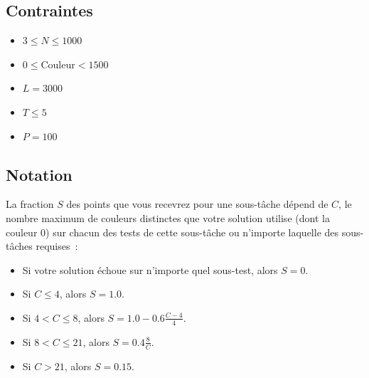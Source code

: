 \documentclass[12pt]{article}
\begin{document}
\subsection{Contraintes}

\begin{itemize}
\item $3 \leq N \leq 1000$
\item $0 \leq \mathrm{Couleur} < 1500$
\item $L = 3000$
\item $T \leq 5$
\item $P = 100$
\end{itemize}

\subsection{Notation}

La fraction $S$ des points que vous recevrez pour une sous-tâche dépend de $C$, le nombre maximum de couleurs distinctes que votre solution utilise (dont la couleur $0$) sur chacun des tests de cette sous-tâche ou n'importe laquelle des sous-tâches requises :

\begin{itemize}
\item Si votre solution échoue sur n'importe quel sous-test, alors $S = 0$.
\item Si $C \leq 4$, alors $S = 1.0$.
\item Si $4 < C \leq 8$, alors $S = 1.0 - 0.6 \frac{C - 4}{4}$.
\item Si $8 < C \leq 21$, alors $S = 0.4 \frac{8}{C}$.
\item Si $C > 21$, alors $S = 0.15$.
\end{itemize}
\end{document}
